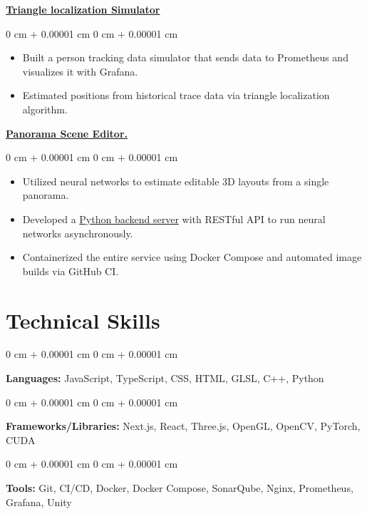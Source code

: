 \documentclass[10pt, letterpaper]{article}
\newenvironment{highlights}{
    \begin{itemize}[
        topsep=0.10 cm,
        parsep=0.10 cm,
        partopsep=0pt,
        itemsep=0pt,
        leftmargin=0 cm + 10pt
    ]
}{
    \end{itemize}
} %
\newenvironment{onecolentry}{
    \begin{adjustwidth}{
        0 cm + 0.00001 cm
    }{
        0 cm + 0.00001 cm
    }
}{
    \end{adjustwidth}
} %
\begin{document}
        \href{https://github.com/tsengyushiang/triangle-localization-simulator}{\textbf{Triangle localization Simulator}}
        \vspace{0.10 cm}
        \begin{onecolentry}
            \begin{highlights}
                \item Built a person tracking data simulator that sends data to Prometheus and visualizes it with Grafana.
                \item Estimated positions from historical trace data via triangle localization algorithm.
            \end{highlights}
        \end{onecolentry}

        \vspace{0.2 cm}

        \href{https://github.com/tsengyushiang/pano-to-mesh}{\textbf{Panorama Scene Editor.}}
        \vspace{0.10 cm}
        \begin{onecolentry}
            \begin{highlights}
                \item Utilized neural networks to estimate editable 3D layouts from a single panorama.
                \item Developed a \href{https://github.com/tsengyushiang/dula-net-server}{Python backend server} with RESTful API to run neural networks asynchronously.
                \item Containerized the entire service using Docker Compose and automated image builds via GitHub CI.
            \end{highlights}
        \end{onecolentry}
        

    \section{Technical Skills}

        \begin{onecolentry}
            \textbf{Languages:} JavaScript, TypeScript, CSS, HTML, GLSL, C++, Python
        \end{onecolentry}

        \vspace{0.2 cm}

        \begin{onecolentry}
            \textbf{Frameworks/Libraries:} Next.js, React, Three.js, OpenGL, OpenCV, PyTorch, CUDA
        \end{onecolentry}

        \vspace{0.2 cm}

        \begin{onecolentry}
            \textbf{Tools:} Git, CI/CD, Docker, Docker Compose, SonarQube, Nginx, Prometheus, Grafana, Unity
        \end{onecolentry}
\end{document}
